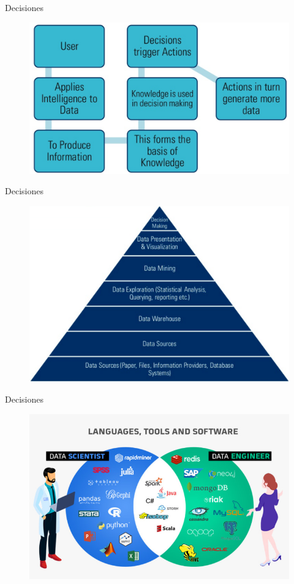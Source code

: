 \documentclass[aspectratio=169]{beamer}
\begin{document}
\begin{frame}{Decisiones}
	\begin{figure}
		\centering
		\includegraphics[width=0.8\linewidth]{Images/decisiones}	
	\end{figure}
\end{frame}


\begin{frame}{Decisiones}
	\begin{figure}
		\centering
		\includegraphics[width=0.7\linewidth]{Images/piramidebi}	
	\end{figure}
\end{frame}

\begin{frame}{Decisiones}
	\begin{figure}
		\centering
		\includegraphics[width=0.8\linewidth]{Images/software}	
	\end{figure}
\end{frame}
\end{document}
